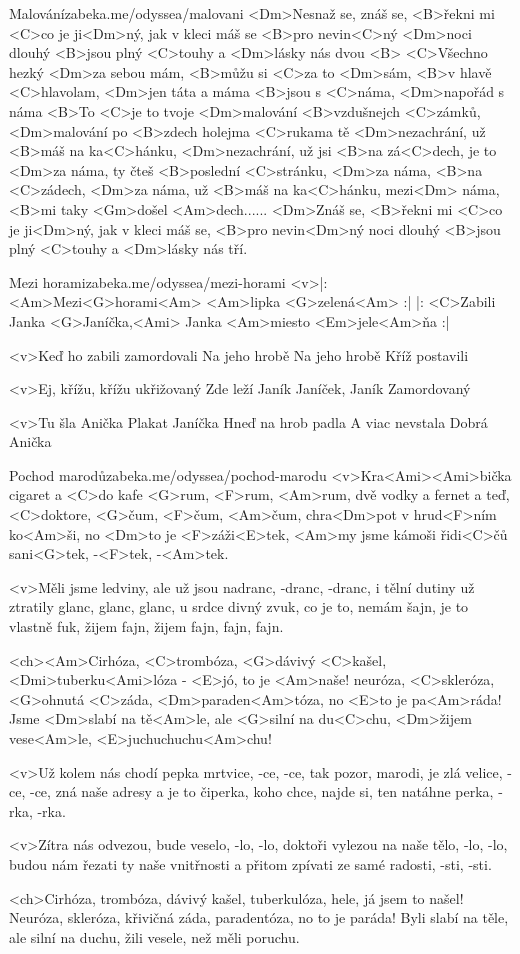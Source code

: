 \begin{song}{17}{Malování}{zabeka.me/odyssea/malovani}
<Dm>Nesnaž se, znáš se, <B>řekni mi <C>co je ji<Dm>ný, jak v kleci máš se <B>pro nevin<C>ný
<Dm>noci dlouhý <B>jsou plný <C>touhy a <Dm>lásky nás dvou <B>
<C>Všechno hezký <Dm>za sebou mám, <B>můžu si <C>za to <Dm>sám, <B>v hlavě <C>hlavolam,
<Dm>jen táta a máma <B>jsou s <C>náma, <Dm>napořád s náma 
<B>To <C>je to tvoje <Dm>malování <B>vzdušnejch <C>zámků, <Dm>malování po <B>zdech holejma <C>rukama
tě <Dm>nezachrání, už <B>máš na ka<C>hánku, <Dm>nezachrání, už jsi <B>na zá<C>dech, 
je to <Dm>za náma, ty čteš <B>poslední <C>stránku, <Dm>za náma, <B>na <C>zádech, <Dm>za náma,
už <B>máš na ka<C>hánku, mezi<Dm> náma, <B>mi taky <Gm>došel <Am>dech......
<Dm>Znáš se, <B>řekni mi <C>co je ji<Dm>ný, jak v kleci máš se, <B>pro nevin<Dm>ný
noci dlouhý <B>jsou plný <C>touhy a <Dm>lásky nás tří.

\end{song}
\begin{song}[Čechomor]{18}{Mezi horami}{zabeka.me/odyssea/mezi-horami}
<v>|: <Am>Mezi<G>horami<Am>
<Am>lipka <G>zelená<Am> :|
|: <C>Zabili Janka 
<G>Janíčka,<Ami> Janka 
<Am>miesto <Em>jele<Am>ňa :|

<v>Keď ho zabili 
zamordovali 
Na jeho hrobě 
Na jeho hrobě 
Kříž postavili 

<v>Ej, křížu, křížu 
ukřižovaný 
Zde leží Janík 
Janíček, Janík 
Zamordovaný 

<v>Tu šla Anička 
Plakat Janíčka 
Hneď na hrob padla 
A viac nevstala 
Dobrá Anička 
\end{song}
\begin{song}{19}{Pochod marodů}{zabeka.me/odyssea/pochod-marodu}
<v>Kra<Ami><Ami>bička cigaret a <C>do kafe <G>rum, <F>rum, <Am>rum,
dvě vodky a fernet a teď, <C>doktore, <G>čum, <F>čum, <Am>čum,
chra<Dm>pot v hrud<F>ním ko<Am>ši, no <Dm>to je <F>záži<E>tek,
<Am>my jsme kámoši řidi<C>čů sani<G>tek, -<F>tek, -<Am>tek.

<v>Měli jsme ledviny, ale už jsou nadranc, -dranc, -dranc,
i tělní dutiny už ztratily glanc, glanc, glanc,
u srdce divný zvuk, co je to, nemám šajn,
je to vlastně fuk, žijem fajn, žijem fajn, fajn, fajn.

<ch><Am>Cirhóza, <C>trombóza, <G>dávivý <C>kašel,
<Dmi>tuberku<Ami>lóza - <E>jó, to je <Am>naše!
neuróza, <C>skleróza, <G>ohnutá <C>záda,
<Dm>paraden<Am>tóza, no <E>to je pa<Am>ráda!
Jsme <Dm>slabí na tě<Am>le, ale <G>silní na du<C>chu,
<Dm>žijem vese<Am>le, <E>juchuchuchu<Am>chu!

<v>Už kolem nás chodí pepka mrtvice, -ce, -ce,
tak pozor, marodi, je zlá velice, -ce, -ce,
zná naše adresy a je to čiperka,
koho chce, najde si, ten natáhne perka, -rka, -rka.

<v>Zítra nás odvezou, bude veselo, -lo, -lo,
doktoři vylezou na naše tělo, -lo, -lo,
budou nám řezati ty naše vnitřnosti
a přitom zpívati ze samé radosti, -sti, -sti.

<ch>Cirhóza, trombóza, dávivý kašel,
tuberkulóza, hele, já jsem to našel!
Neuróza, skleróza, křivičná záda,
paradentóza, no to je paráda!
Byli slabí na těle, ale silní na duchu,
žili vesele, než měli poruchu. 

\end{song}

